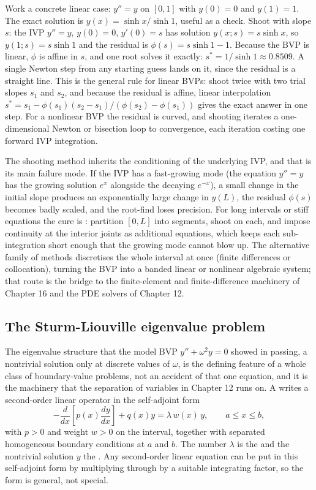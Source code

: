 

Work a concrete linear case: $y'' = y$ on $[0, 1]$ with $y(0) = 0$
and $y(1) = 1$. The exact solution is $y(x) = \sinh x/\sinh 1$,
useful as a check. Shoot with slope $s$: the IVP $y'' = y$,
$y(0) = 0$, $y'(0) = s$ has solution $y(x; s) = s\sinh x$, so
$y(1; s) = s\sinh 1$ and the residual is $\phi(s) = s\sinh 1 - 1$.
Because the BVP is linear, $\phi$ is affine in $s$, and one root
solves it exactly: $s^{\ast} = 1/\sinh 1 \approx 0.8509$. A single
Newton step from any starting guess lands on it, since the residual
is a straight line. This is the general rule for linear BVPs: shoot
twice with two trial slopes $s_{1}$ and $s_{2}$, and because the
residual is affine, linear interpolation $s^{\ast} = s_{1} -
\phi(s_{1})(s_{2} - s_{1})/(\phi(s_{2}) - \phi(s_{1}))$ gives the
exact answer in one step. For a nonlinear BVP the residual is curved,
and shooting iterates a one-dimensional Newton or bisection loop to
convergence, each iteration costing one forward IVP integration.

The shooting method inherits the conditioning of the underlying IVP,
and that is its main failure mode. If the IVP has a fast-growing
mode (the equation $y'' = y$ has the growing solution $e^{x}$
alongside the decaying $e^{-x}$), a small change in the initial slope
produces an exponentially large change in $y(L)$, the residual
$\phi(s)$ becomes badly scaled, and the root-find loses precision.
For long intervals or stiff equations the cure is : partition $[0, L]$ into segments, shoot on each, and
impose continuity at the interior joints as additional equations,
which keeps each sub-integration short enough that the growing mode
cannot blow up. The alternative family of methods discretises the
whole interval at once (finite differences or collocation), turning
the BVP into a banded linear or nonlinear algebraic system; that
route is the bridge to the finite-element and finite-difference
machinery of Chapter 16 and the PDE solvers of Chapter 12.

\subsection{The Sturm-Liouville eigenvalue problem}

The eigenvalue structure that the model BVP $y'' + \omega^{2} y = 0$
showed in passing, a nontrivial solution only at discrete values of
$\omega$, is the defining feature of a whole class of boundary-value
problems, not an accident of that one equation, and it is the
machinery that the separation of variables in Chapter 12 runs on. A
 writes a second-order linear
operator in the self-adjoint form
\[
-\frac{d}{dx}\!\left[p(x)\frac{dy}{dx}\right] + q(x) y =
\lambda\, w(x)\, y, \qquad a \leq x \leq b,
\]
with $p > 0$ and weight $w > 0$ on the interval, together with
separated homogeneous boundary conditions at $a$ and $b$. The number
$\lambda$ is the  and the nontrivial solution
$y$ the . Any second-order linear equation can
be put in this self-adjoint form by multiplying through by a suitable
integrating factor, so the form is general, not special.

